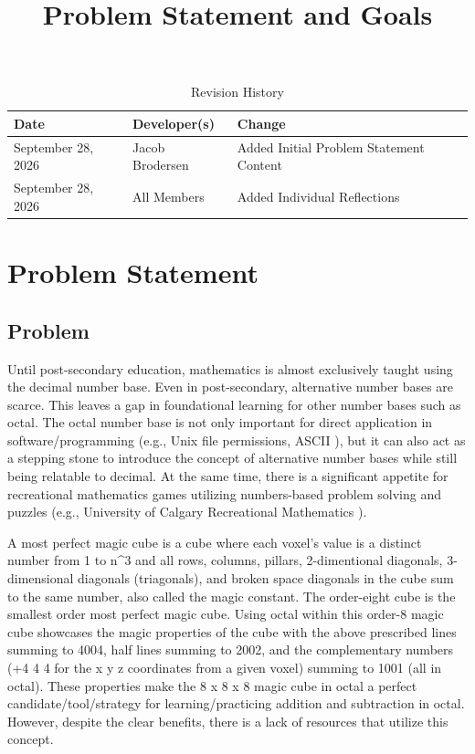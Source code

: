 \documentclass{article}
\title{Problem Statement and Goals\\\progname}
\author{\authname}
\date{}
\begin{document}
\maketitle

\begin{table}[hp]
\caption{Revision History} \label{TblRevisionHistory}
\begin{tabularx}{\textwidth}{llX}
\toprule
\textbf{Date} & \textbf{Developer(s)} & \textbf{Change}\\
\midrule
September 28, 2026 & Jacob Brodersen & Added Initial Problem Statement Content\\
September 28, 2026 & All Members & Added Individual Reflections\\
\bottomrule
\end{tabularx}
\end{table}

\section{Problem Statement}

\subsection{Problem}

Until post-secondary education, mathematics is almost exclusively taught using the decimal number base. Even in post-secondary, alternative number bases are scarce. This leaves a gap in foundational learning for other number bases such as octal. The octal number base is not only important for direct application in software/programming (e.g., Unix file permissions, ASCII \cite{LenovoOctal}), but it can also act as a stepping stone to introduce the concept of alternative number bases while still being relatable to decimal. At the same time, there is a significant appetite for recreational mathematics games utilizing numbers-based problem solving and puzzles (e.g., University of Calgary Recreational Mathematics \cite{UoCRecMath}).

A most perfect magic cube is a cube where each voxel's value is a distinct number from 1 to n\textasciicircum{}3 and all rows, columns, pillars, 2-dimentional diagonals, 3-dimensional diagonals (triagonals), and broken space diagonals in the cube sum to the same number, also called the magic constant. The order-eight cube is the smallest order most perfect magic cube. Using octal within this order-8 magic cube showcases the magic properties of the cube with the above prescribed lines summing to 4004, half lines summing to 2002, and the complementary numbers (+4 4 4 for the x y z coordinates from a given voxel) summing to 1001 (all in octal). These properties make the 8 x 8 x 8 magic cube in octal a perfect candidate/tool/strategy for learning/practicing addition and subtraction in octal. However, despite the clear benefits, there is a lack of resources that utilize this concept.
\end{document}
